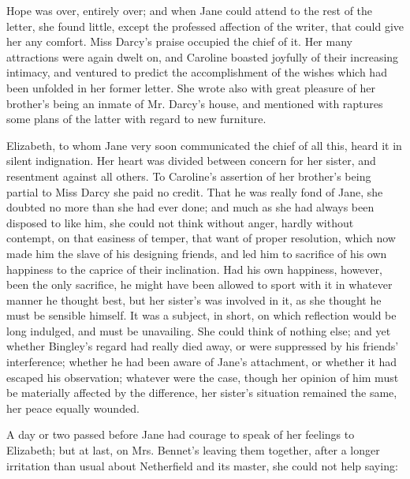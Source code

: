 Hope was over, entirely over; and when Jane could attend to the rest of the letter, she found little, except the professed affection of the writer, that could give her any comfort. Miss Darcy's praise occupied the chief of it. Her many attractions were again dwelt on, and Caroline boasted joyfully of their increasing intimacy, and ventured to predict the accomplishment of the wishes which had been unfolded in her former letter. She wrote also with great pleasure of her brother's being an inmate of Mr. Darcy's house, and mentioned with raptures some plans of the latter with regard to new furniture.

Elizabeth, to whom Jane very soon communicated the chief of all this, heard it in silent indignation. Her heart was divided between concern for her sister, and resentment against all others. To Caroline's assertion of her brother's being partial to Miss Darcy she paid no credit. That he was really fond of Jane, she doubted no more than she had ever done; and much as she had always been disposed to like him, she could not think without anger, hardly without contempt, on that easiness of temper, that want of proper resolution, which now made him the slave of his designing friends, and led him to sacrifice of his own happiness to the caprice of their inclination. Had his own happiness, however, been the only sacrifice, he might have been allowed to sport with it in whatever manner he thought best, but her sister's was involved in it, as she thought he must be sensible himself. It was a subject, in short, on which reflection would be long indulged, and must be unavailing. She could think of nothing else; and yet whether Bingley's regard had really died away, or were suppressed by his friends' interference; whether he had been aware of Jane's attachment, or whether it had escaped his observation; whatever were the case, though her opinion of him must be materially affected by the difference, her sister's situation remained the same, her peace equally wounded.

A day or two passed before Jane had courage to speak of her feelings to Elizabeth; but at last, on Mrs. Bennet's leaving them together, after a longer irritation than usual about Netherfield and its master, she could not help saying:


